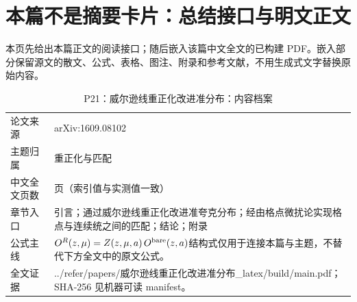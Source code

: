 \documentclass[UTF8,11pt,oneside]{ctexbook}
\begin{document}
\section*{本篇不是摘要卡片：总结接口与明文正文}
本页先给出本篇正文的阅读接口；随后嵌入该篇中文全文的已构建 PDF。嵌入部分保留源文的散文、公式、表格、图注、附录和参考文献，不用生成式文字替换原始内容。
\begin{table}[htbp]
  \centering
  \caption{P21：威尔逊线重正化改进准分布：内容档案}
  \small
  \begin{tabularx}{0.96\textwidth}{@{}p{3.3cm}>{\raggedright\arraybackslash}X@{}}
    \toprule
    论文来源 & arXiv:1609.08102 \\
    主题归属 & 重正化与匹配 \\
    中文全文页数 & 7 页（索引值与实测值一致） \\
    章节入口 & 引言；通过威尔逊线重正化改进准夸克分布；经由格点微扰论实现格点与连续统之间的匹配；结论；附录 \\
    公式主线 & $O^{R}(z,\mu)=Z(z,\mu,a)\,O^{\rm bare}(z,a)$\newline\scriptsize 结构式仅用于连接本篇与主题，不替代下方全文中的原文公式。 \\
    全文证据 & ../\allowbreak{}refer/\allowbreak{}papers/\allowbreak{}威尔逊线重正化改进准分布\_\allowbreak{}latex/\allowbreak{}build/\allowbreak{}main.pdf；SHA-256 见机器可读 manifest。 \\
    \bottomrule
  \end{tabularx}
\end{table}
\end{document}
